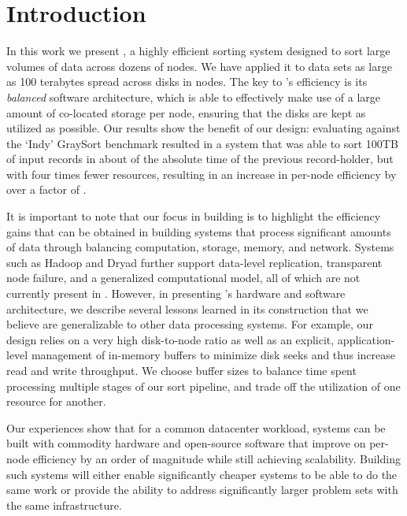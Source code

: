 \section{Introduction}
\label{tritonsort:sec:intro}

In this work we present \tritonsort, a highly efficient sorting system designed
to sort large volumes of data across dozens of nodes. We have applied it to
data sets as large as 100 terabytes spread across \tsdisks disks in \tsnodes
nodes.  The key to \tritonsort's efficiency is its \textit{balanced} software
architecture, which is able to effectively make use of a large amount of
co-located storage per node, ensuring that the disks are kept as utilized as
possible.  Our results show the benefit of our design: evaluating \tritonsort
against the `Indy' GraySort benchmark\cite{terasort} resulted in a system that
was able to sort 100TB of input records in about \tspercent of the absolute time
of the previous record-holder, but with four times fewer resources, resulting
in an increase in per-node efficiency by over a factor of \tsimprovementfactor.

It is important to note that our focus in building \tritonsort is to highlight
the efficiency gains that can be obtained in building systems that process
significant amounts of data through balancing computation, storage, memory, and
network.  Systems such as Hadoop and Dryad further support data-level
replication, transparent node failure, and a generalized computational model,
all of which are not currently present in \tritonsort.  However, in presenting
\tritonsort's hardware and software architecture, we describe several lessons
learned in its construction that we believe are generalizable to other data
processing systems.  For example, our design relies on a very high disk-to-node
ratio as well as an explicit, application-level management of in-memory buffers
to minimize disk seeks and thus increase read and write throughput.  We choose
buffer sizes to balance time spent processing multiple stages of our sort
pipeline, and trade off the utilization of one resource for another.

Our experiences show that for a common datacenter workload, systems can be
built with commodity hardware and open-source software that improve on per-node
efficiency by an order of magnitude while still achieving scalability.
Building such systems will either enable significantly cheaper systems to be
able to do the same work or provide the ability to address significantly larger
problem sets with the same infrastructure.

